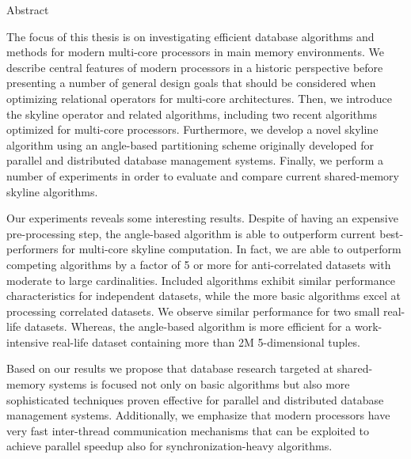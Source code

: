 \documentclass[12pt,a4paper,twoside]{report}
\begin{document}
\cleardoublepage
\begin{titlepage}
\begin{poliabstract}{Abstract}

The focus of this thesis is on investigating efficient database algorithms
and methods for modern multi-core processors in main memory environments.
We describe central features of modern processors in a historic perspective
before presenting a number of general design goals that should be
considered when optimizing relational operators for multi-core
architectures. Then, we introduce the skyline operator and related
algorithms, including two recent algorithms optimized for multi-core
processors. Furthermore, we develop a novel skyline algorithm using an
angle-based partitioning scheme originally developed for parallel and
distributed database management systems. Finally, we perform a number of
experiments in order to evaluate and compare current shared-memory skyline
algorithms.

Our experiments reveals some interesting results. Despite of having an
expensive pre-processing step, the angle-based algorithm is able to
outperform current best-performers for multi-core skyline computation.
In fact, we are able to outperform competing algorithms by a factor of
5 or more for anti-correlated datasets with moderate to large
cardinalities. Included algorithms exhibit similar performance
characteristics for independent datasets, while the more basic
algorithms excel at processing correlated datasets. We observe similar
performance for two small real-life datasets. Whereas, the angle-based
algorithm is more efficient for a work-intensive real-life dataset
containing more than 2M 5-dimensional tuples.

Based on our results we propose that database research targeted at
shared-memory systems is focused not only on basic algorithms but also
more sophisticated techniques proven effective for parallel and
distributed database management systems. Additionally, we emphasize
that modern processors have very fast inter-thread communication
mechanisms that can be exploited to achieve parallel speedup also for
synchronization-heavy algorithms.

\end{poliabstract}
\end{titlepage}
\end{document}
